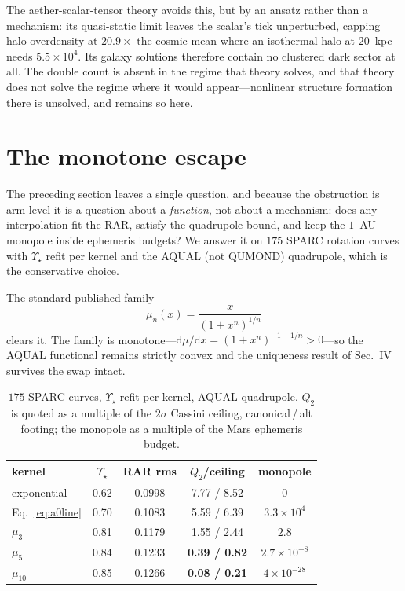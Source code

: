 \documentclass[aps,prd,twocolumn,superscriptaddress,nofootinbib,floatfix]{revtex4-2}
\begin{document}
The aether-scalar-tensor theory avoids this, but by an ansatz rather than a mechanism: its
quasi-static limit leaves the scalar's tick unperturbed, capping halo overdensity at
$20.9\times$ the cosmic mean where an isothermal halo at $20$~kpc needs $5.5\times10^{4}$.
Its galaxy solutions therefore contain no clustered dark sector at all. The double count is
absent in the regime that theory solves, and that theory does not solve the regime where it
would appear---nonlinear structure formation there is unsolved, and remains so here.

\section{The monotone escape}

The preceding section leaves a single question, and because the obstruction is arm-level it is a
question about a \emph{function}, not about a mechanism: does any interpolation fit the RAR,
satisfy the quadrupole bound, and keep the $1$~AU monopole inside ephemeris budgets? We answer it
on $175$ SPARC rotation curves with $\Upsilon_\star$ refit per kernel and the AQUAL (not QUMOND)
quadrupole, which is the conservative choice.

The standard published family
\begin{equation}
\mu_n(x) = \frac{x}{(1+x^n)^{1/n}}
\end{equation}
clears it. The family is monotone---$\mathrm{d}\mu/\mathrm{d}x = (1+x^n)^{-1-1/n} > 0$---so the
AQUAL functional remains strictly convex and the uniqueness result of Sec.~IV survives the swap
intact.

\begin{table}[b]
\caption{$175$ SPARC curves, $\Upsilon_\star$ refit per kernel, AQUAL quadrupole. $Q_2$ is
quoted as a multiple of the $2\sigma$ Cassini ceiling, canonical\,/\,alt footing; the monopole
as a multiple of the Mars ephemeris budget.}
\begin{ruledtabular}
\begin{tabular}{lcccc}
kernel & $\Upsilon_\star$ & RAR rms & $Q_2$/ceiling & monopole \\ \hline
exponential      & 0.62 & 0.0998 & 7.77 / 8.52 & $0$ \\
Eq.~\eqref{eq:a0line} & 0.70 & 0.1083 & 5.59 / 6.39 & $3.3\times10^{4}$ \\
$\mu_3$          & 0.81 & 0.1179 & 1.55 / 2.44 & $2.8$ \\
$\mu_5$          & 0.84 & 0.1233 & \textbf{0.39 / 0.82} & $2.7\times10^{-8}$ \\
$\mu_{10}$       & 0.85 & 0.1266 & \textbf{0.08 / 0.21} & $4\times10^{-28}$ \\
\end{tabular}
\end{ruledtabular}
\end{table}
\end{document}
